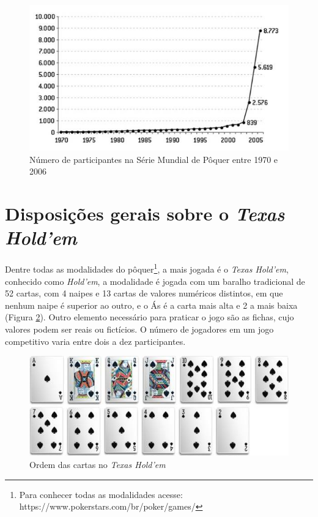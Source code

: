 \documentclass[
	12pt,				%
	oneside,			%
	a4paper,			%
	chapter=TITLE,		%
	section=TITLE,		%
	subsection=Title,	%
	subsubsection=Title,%
	brazil,				%
	]{abntex2}
\begin{document}
\begin{figure}[t]
	\centering
	\includegraphics[scale=.7]{grafico}
	\caption{Número de participantes na Série Mundial de Pôquer entre 1970 e 2006}
	\label{participantesWSOP}
\end{figure}

\clearpage
\section{Disposições gerais sobre o \textit{Texas Hold'em}}
Dentre todas as modalidades do pôquer\footnote{Para conhecer todas as modalidades acesse: https://www.pokerstars.com/br/poker/games/}, a mais jogada é o \textit{Texas Hold'em}, conhecido como \textit{Hold'em}, a modalidade é jogada com um baralho tradicional de 52 cartas, com 4 naipes e 13 cartas de valores numéricos distintos, em que nenhum naipe é superior ao outro, e o Ás é a carta mais alta e 2 a mais baixa (Figura \ref{ordem cartas}). Outro elemento necessário para praticar o jogo são as fichas, cujo valores podem ser reais ou fictícios. O número de jogadores em um jogo competitivo varia entre dois a dez participantes.

\begin{figure}[h]
	\centering
	\includegraphics[scale=.6]{ordem-cartas}
	\caption{Ordem das cartas no \textit{Texas Hold'em}}
	\label{ordem cartas}
\end{figure}
\end{document}
